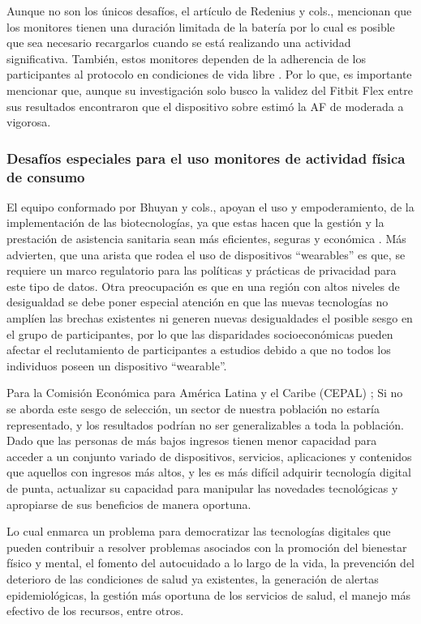 Aunque no son los únicos desafíos, el artículo de Redenius y cols., mencionan que los monitores tienen una duración limitada de la batería por lo cual es posible que sea necesario recargarlos cuando se está realizando una actividad significativa. También, estos monitores dependen de la adherencia de los participantes al protocolo en condiciones de vida libre \citep{Redenius2019Fitbit}. Por lo que, es importante mencionar que, aunque su investigación solo busco la validez del Fitbit Flex entre sus resultados encontraron que el dispositivo sobre estimó la AF de moderada a vigorosa.

\subsubsection{Desafíos especiales para el uso monitores de actividad física de consumo}
\label{subsubsec:desafios_monitores_af}

El equipo conformado por Bhuyan y cols., apoyan el uso y empoderamiento, de la implementación de las biotecnologías, ya que estas hacen que la gestión y la prestación de asistencia sanitaria sean más eficientes, seguras y económica \citep{Bhuyan2016Mobile}. Más advierten, que una arista que rodea el uso de dispositivos ``wearables'' es que, se requiere un marco regulatorio para las políticas y prácticas de privacidad para este tipo de datos. Otra preocupación es que en una región con altos niveles de desigualdad se debe poner especial atención en que las nuevas tecnologías no amplíen las brechas existentes ni generen nuevas desigualdades el posible sesgo en el grupo de participantes, por lo que las disparidades socioeconómicas pueden afectar el reclutamiento de participantes a estudios debido a que no todos los individuos poseen un dispositivo ``wearable''.

Para la Comisión Económica para América Latina y el Caribe (CEPAL) \citep{Martinez2020Revolucion}; Si no se aborda este sesgo de selección, un sector de nuestra población no estaría representado, y los resultados podrían no ser generalizables a toda la población. Dado que las personas de más bajos ingresos tienen menor capacidad para acceder a un conjunto variado de dispositivos, servicios, aplicaciones y contenidos que aquellos con ingresos más altos, y les es más difícil adquirir tecnología digital de punta, actualizar su capacidad para manipular las novedades tecnológicas y apropiarse de sus beneficios de manera oportuna.

Lo cual enmarca un problema para democratizar las tecnologías digitales que pueden contribuir a resolver problemas asociados con la promoción del bienestar físico y mental, el fomento del autocuidado a lo largo de la vida, la prevención del deterioro de las condiciones de salud ya existentes, la generación de alertas epidemiológicas, la gestión más oportuna de los servicios de salud, el manejo más efectivo de los recursos, entre otros.

